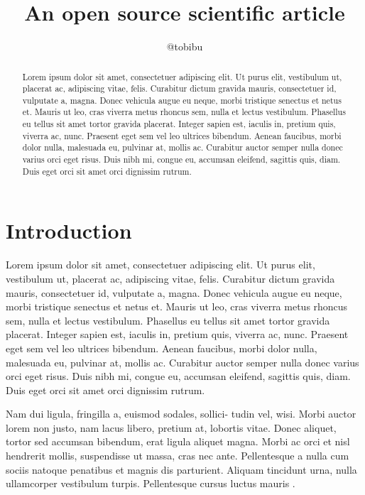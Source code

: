 \documentclass[twocolumn]{aastex631}
\begin{document}
\title{An open source scientific article}

\author{@tobibu}

\begin{abstract}
    Lorem ipsum dolor sit amet, consectetuer adipiscing elit.
    Ut purus elit, vestibulum ut, placerat ac, adipiscing vitae, felis.
    Curabitur dictum gravida mauris, consectetuer id, vulputate a, magna.
    Donec vehicula augue eu neque, morbi tristique senectus et netus et.
    Mauris ut leo, cras viverra metus rhoncus sem, nulla et lectus vestibulum.
    Phasellus eu tellus sit amet tortor gravida placerat.
    Integer sapien est, iaculis in, pretium quis, viverra ac, nunc.
    Praesent eget sem vel leo ultrices bibendum.
    Aenean faucibus, morbi dolor nulla, malesuada eu, pulvinar at, mollis ac.
    Curabitur auctor semper nulla donec varius orci eget risus.
    Duis nibh mi, congue eu, accumsan eleifend, sagittis quis, diam.
    Duis eget orci sit amet orci dignissim rutrum.
\end{abstract}

\section{Introduction}
\label{sec:intro}

Lorem ipsum dolor sit amet, consectetuer adipiscing elit.
Ut purus elit, vestibulum ut, placerat ac, adipiscing vitae, felis.
Curabitur dictum gravida mauris, consectetuer id, vulputate a, magna.
Donec vehicula augue eu neque, morbi tristique senectus et netus et.
Mauris ut leo, cras viverra metus rhoncus sem, nulla et lectus vestibulum.
Phasellus eu tellus sit amet tortor gravida placerat.
Integer sapien est, iaculis in, pretium quis, viverra ac, nunc.
Praesent eget sem vel leo ultrices bibendum.
Aenean faucibus, morbi dolor nulla, malesuada eu, pulvinar at, mollis ac.
Curabitur auctor semper nulla donec varius orci eget risus.
Duis nibh mi, congue eu, accumsan eleifend, sagittis quis, diam.
Duis eget orci sit amet orci dignissim rutrum.

Nam dui ligula, fringilla a, euismod sodales, sollici- tudin vel, wisi.
Morbi auctor lorem non justo, nam lacus libero, pretium at, lobortis vitae.
Donec aliquet, tortor sed accumsan bibendum, erat ligula aliquet magna.
Morbi ac orci et nisl hendrerit mollis, suspendisse ut massa, cras nec ante.
Pellentesque a nulla cum sociis natoque penatibus et magnis dis parturient.
Aliquam tincidunt urna, nulla ullamcorper vestibulum turpis.
Pellentesque cursus luctus mauris \citep{Luger2021}.
\end{document}
